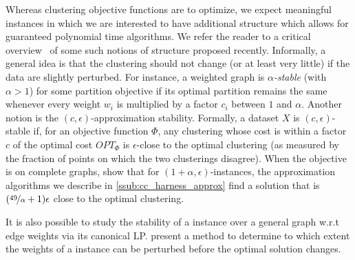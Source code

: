 Whereas clustering objective functions are \NPh{} to optimize, we expect meaningful instances
in which we are interested to have additional structure which allows for guaranteed polynomial time
algorithms. We refer the reader to a critical overview~\autocite{clusteringFeasibility15} of some
such notions of structure proposed recently. Informally, a general idea is that the clustering should not
change (or at least very little) if the data are slightly perturbed. For instance, a weighted graph
is \emph{$\alpha$-stable} (with $\alpha>1$) for some partition objective if its optimal partition
remains the same whenever every weight $w_i$ is multiplied by a factor $c_i$ between $1$ and
$\alpha$.
Another notion is the $(c, \epsilon)$-approximation stability. Formally, a dataset $X$ is $(c,
\epsilon)$-stable if, for an objective function $\Phi$, any clustering whose cost is within a factor
$c$ of the optimal cost $OPT_{\Phi}$ is $\epsilon$-close to the optimal clustering (as measured by
the fraction of points on which the two clusterings disagree). When the objective is \mind{} on
complete graphs, \textcite{StableCC09} show that for $(1+\alpha, \epsilon)$-instances, the
approximation algorithms we describe in \autoref{ssub:cc_harness_approx} find a solution that is
$(\nicefrac{49}{\alpha} + 1)\epsilon$ close to the optimal clustering.

It is also possible to study the stability of a \pcc{} instance over a general graph w.r.t edge
weights via its canonical \mind{} LP. \Textcite{StableLP09} present a method to determine to which
extent the weights of a \pcc{} instance can be perturbed before the optimal solution changes.

